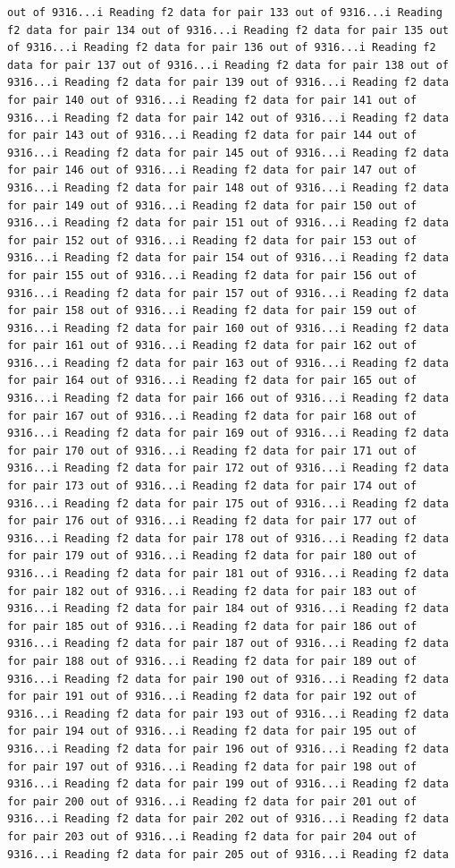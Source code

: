 \documentclass[
]{article}
\begin{document}
\begin{verbatim}
out of 9316...i Reading f2 data for pair 133 out of 9316...i Reading f2 data for pair 134 out of 9316...i Reading f2 data for pair 135 out of 9316...i Reading f2 data for pair 136 out of 9316...i Reading f2 data for pair 137 out of 9316...i Reading f2 data for pair 138 out of 9316...i Reading f2 data for pair 139 out of 9316...i Reading f2 data for pair 140 out of 9316...i Reading f2 data for pair 141 out of 9316...i Reading f2 data for pair 142 out of 9316...i Reading f2 data for pair 143 out of 9316...i Reading f2 data for pair 144 out of 9316...i Reading f2 data for pair 145 out of 9316...i Reading f2 data for pair 146 out of 9316...i Reading f2 data for pair 147 out of 9316...i Reading f2 data for pair 148 out of 9316...i Reading f2 data for pair 149 out of 9316...i Reading f2 data for pair 150 out of 9316...i Reading f2 data for pair 151 out of 9316...i Reading f2 data for pair 152 out of 9316...i Reading f2 data for pair 153 out of 9316...i Reading f2 data for pair 154 out of 9316...i Reading f2 data for pair 155 out of 9316...i Reading f2 data for pair 156 out of 9316...i Reading f2 data for pair 157 out of 9316...i Reading f2 data for pair 158 out of 9316...i Reading f2 data for pair 159 out of 9316...i Reading f2 data for pair 160 out of 9316...i Reading f2 data for pair 161 out of 9316...i Reading f2 data for pair 162 out of 9316...i Reading f2 data for pair 163 out of 9316...i Reading f2 data for pair 164 out of 9316...i Reading f2 data for pair 165 out of 9316...i Reading f2 data for pair 166 out of 9316...i Reading f2 data for pair 167 out of 9316...i Reading f2 data for pair 168 out of 9316...i Reading f2 data for pair 169 out of 9316...i Reading f2 data for pair 170 out of 9316...i Reading f2 data for pair 171 out of 9316...i Reading f2 data for pair 172 out of 9316...i Reading f2 data for pair 173 out of 9316...i Reading f2 data for pair 174 out of 9316...i Reading f2 data for pair 175 out of 9316...i Reading f2 data for pair 176 out of 9316...i Reading f2 data for pair 177 out of 9316...i Reading f2 data for pair 178 out of 9316...i Reading f2 data for pair 179 out of 9316...i Reading f2 data for pair 180 out of 9316...i Reading f2 data for pair 181 out of 9316...i Reading f2 data for pair 182 out of 9316...i Reading f2 data for pair 183 out of 9316...i Reading f2 data for pair 184 out of 9316...i Reading f2 data for pair 185 out of 9316...i Reading f2 data for pair 186 out of 9316...i Reading f2 data for pair 187 out of 9316...i Reading f2 data for pair 188 out of 9316...i Reading f2 data for pair 189 out of 9316...i Reading f2 data for pair 190 out of 9316...i Reading f2 data for pair 191 out of 9316...i Reading f2 data for pair 192 out of 9316...i Reading f2 data for pair 193 out of 9316...i Reading f2 data for pair 194 out of 9316...i Reading f2 data for pair 195 out of 9316...i Reading f2 data for pair 196 out of 9316...i Reading f2 data for pair 197 out of 9316...i Reading f2 data for pair 198 out of 9316...i Reading f2 data for pair 199 out of 9316...i Reading f2 data for pair 200 out of 9316...i Reading f2 data for pair 201 out of 9316...i Reading f2 data for pair 202 out of 9316...i Reading f2 data for pair 203 out of 9316...i Reading f2 data for pair 204 out of 9316...i Reading f2 data for pair 205 out of 9316...i Reading f2 data 
\end{verbatim}
\end{document}
